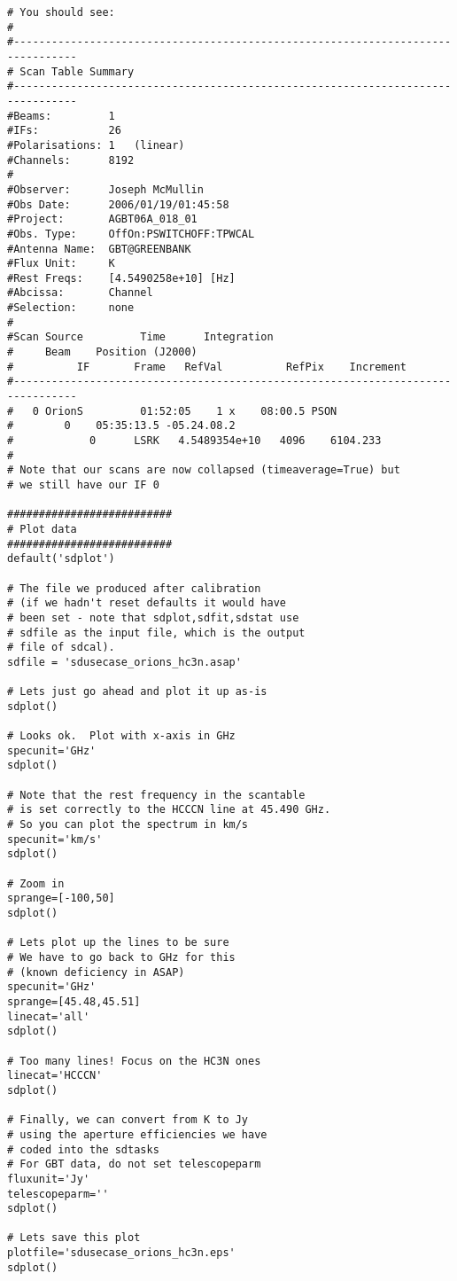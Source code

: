 \begin{verbatim}
# You should see:
#
#--------------------------------------------------------------------------------
# Scan Table Summary
#--------------------------------------------------------------------------------
#Beams:         1   
#IFs:           26  
#Polarisations: 1   (linear)
#Channels:      8192
#
#Observer:      Joseph McMullin
#Obs Date:      2006/01/19/01:45:58
#Project:       AGBT06A_018_01
#Obs. Type:     OffOn:PSWITCHOFF:TPWCAL
#Antenna Name:  GBT@GREENBANK
#Flux Unit:     K
#Rest Freqs:    [4.5490258e+10] [Hz]
#Abcissa:       Channel
#Selection:     none
#
#Scan Source         Time      Integration       
#     Beam    Position (J2000)
#          IF       Frame   RefVal          RefPix    Increment   
#--------------------------------------------------------------------------------
#   0 OrionS         01:52:05    1 x    08:00.5 PSON 
#        0    05:35:13.5 -05.24.08.2
#            0      LSRK   4.5489354e+10   4096    6104.233
#
# Note that our scans are now collapsed (timeaverage=True) but 
# we still have our IF 0

##########################
# Plot data
##########################
default('sdplot')

# The file we produced after calibration
# (if we hadn't reset defaults it would have
# been set - note that sdplot,sdfit,sdstat use
# sdfile as the input file, which is the output
# file of sdcal).
sdfile = 'sdusecase_orions_hc3n.asap'

# Lets just go ahead and plot it up as-is
sdplot()

# Looks ok.  Plot with x-axis in GHz
specunit='GHz'
sdplot()

# Note that the rest frequency in the scantable
# is set correctly to the HCCCN line at 45.490 GHz.
# So you can plot the spectrum in km/s
specunit='km/s'
sdplot()

# Zoom in
sprange=[-100,50]
sdplot()

# Lets plot up the lines to be sure
# We have to go back to GHz for this
# (known deficiency in ASAP)
specunit='GHz'
sprange=[45.48,45.51]
linecat='all'
sdplot()

# Too many lines! Focus on the HC3N ones
linecat='HCCCN'
sdplot()

# Finally, we can convert from K to Jy
# using the aperture efficiencies we have
# coded into the sdtasks
# For GBT data, do not set telescopeparm
fluxunit='Jy'
telescopeparm=''
sdplot()

# Lets save this plot
plotfile='sdusecase_orions_hc3n.eps'
sdplot()


\end{verbatim}
